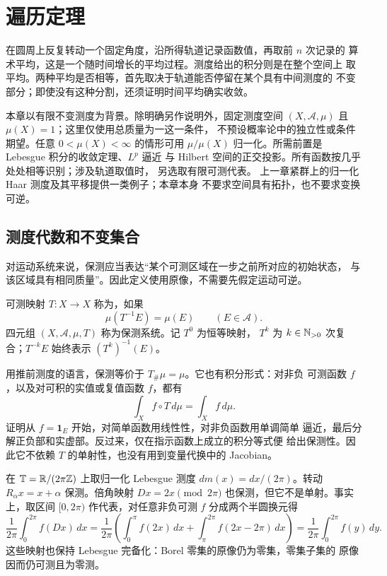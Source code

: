\chapter{遍历定理}
\label{chap:ergodic-theorems}

在圆周上反复转动一个固定角度，沿所得轨道记录函数值，再取前 $n$ 次记录的
算术平均，这是一个随时间增长的平均过程。测度给出的积分则是在整个空间上
取平均。两种平均是否相等，首先取决于轨道能否停留在某个具有中间测度的
不变部分；即使没有这种分割，还须证明时间平均确实收敛。

本章以有限不变测度为背景。除明确另作说明外，固定测度空间
$(X,\mathcal A,\mu)$ 且 $\mu(X)=1$；这里仅使用总质量为一这一条件，
不预设概率论中的独立性或条件期望。任意 $0<\mu(X)<\infty$ 的情形可用
$\mu/\mu(X)$ 归一化。所需前置是 Lebesgue 积分的收敛定理、$L^p$ 逼近
与 Hilbert 空间的正交投影。所有函数按几乎处处相等识别；涉及轨道取值时，
另选取有限可测代表。
上一章紧群上的归一化 Haar 测度及其平移提供一类例子；本章本身
不要求空间具有拓扑，也不要求变换可逆。

\section{测度代数和不变集合}
\label{sec:measure-algebra-invariants}

对运动系统来说，保测应当表达“某个可测区域在一步之前所对应的初始状态，
与该区域具有相同质量”。因此定义使用原像，不需要先假定运动可逆。

\begin{definition}\label{def:measure-preserving-transformation}
可测映射 $T:X\to X$ 称为，如果
\[
 \mu(T^{-1}E)=\mu(E)\qquad(E\in\mathcal A).
\]
四元组 $(X,\mathcal A,\mu,T)$ 称为保测系统。记 $T^0$ 为恒等映射，
$T^k$ 为 $k\in\mathbb{N}_{>0}$ 次复合；$T^{-k}E$ 始终表示 $(T^k)^{-1}(E)$。
\end{definition}

用推前测度的语言，保测等价于 $T_\#\mu=\mu$。它也有积分形式：对非负
可测函数 $f$，以及对可积的实值或复值函数 $f$，都有
\begin{equation}\label{eq:ergodic-integral-invariance}
 \int_X f\circ T\,d\mu=\int_Xf\,d\mu.
\end{equation}
证明从 $f=\mathbf1_E$ 开始，对简单函数用线性性，对非负函数用单调简单
逼近，最后分解正负部和实虚部。反过来，仅在指示函数上成立的积分等式便
给出保测性。因此它不依赖 $T$ 的单射性，也没有用到变量代换中的 Jacobian。

\begin{example}\label{ex:ergodic-doubling-preservation}
在 $\mathbb T=\mathbb{R}/(2\pi\mathbb{Z})$ 上取归一化 Lebesgue 测度
$dm(x)=dx/(2\pi)$。转动 $R_\alpha x=x+\alpha$ 保测。倍角映射
$D x=2x\pmod{2\pi}$ 也保测，但它不是单射。事实上，取区间
$[0,2\pi)$ 作代表，对任意非负可测 $f$ 分成两个半圆换元得
\[
 \frac1{2\pi}\int_0^{2\pi}f(Dx)\,dx
 =\frac1{2\pi}\left(\int_0^\pi f(2x)\,dx
       +\int_\pi^{2\pi}f(2x-2\pi)\,dx\right)
 =\frac1{2\pi}\int_0^{2\pi}f(y)\,dy.
\]
这些映射也保持 Lebesgue 完备化：Borel 零集的原像仍为零集，零集子集的
原像因而仍可测且为零测。
\end{example}

